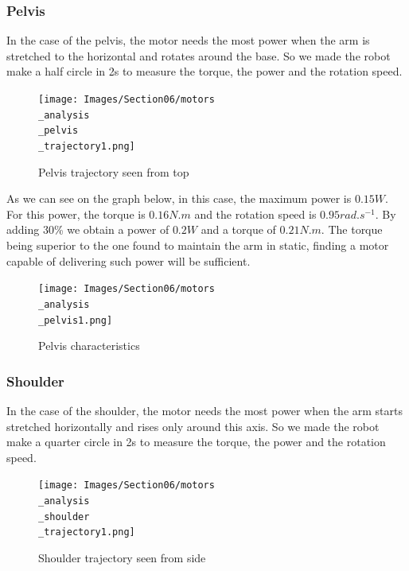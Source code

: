 \subsubsection{Pelvis}

In the case of the pelvis, the motor needs the most power when the arm is stretched to the horizontal and rotates around the base. So we made the robot make a half circle in 2s to measure the torque, the power and the rotation speed.
\begin{figure}[ht]
    \centering
    \texttt{[image: Images/Section06/motors\\\_analysis\\\_pelvis\\\_trajectory1.png]}
    \caption{Pelvis trajectory seen from top}
    \label{fig:PelvisTrajectory}
\end{figure}
\FloatBarrier

\bigbreak
As we can see on the graph below, in this case, the maximum power is $0.15W$. For this power, the torque is $0.16N.m$ and the rotation speed is $0.95rad.s^{-1}$. By adding 30\% we obtain a power of $0.2W$ and a torque of $0.21N.m$. The torque being superior to the one found to maintain the arm in static, finding a motor capable of delivering such power will be sufficient.
\begin{figure}[ht]
    \centering
    \texttt{[image: Images/Section06/motors\\\_analysis\\\_pelvis1.png]}
    \caption{Pelvis characteristics}
    \label{fig:PelvisCharacteristics}
\end{figure}
\FloatBarrier

\subsubsection{Shoulder}

In the case of the shoulder, the motor needs the most power when the arm starts stretched horizontally and rises only around this axis. So we made the robot make a quarter circle in 2s to measure the torque, the power and the rotation speed.
\begin{figure}[ht]
    \centering
    \texttt{[image: Images/Section06/motors\\\_analysis\\\_shoulder\\\_trajectory1.png]}
    \caption{Shoulder trajectory seen from side}
    \label{fig:ShoulderTrajectory}
\end{figure}
\FloatBarrier

